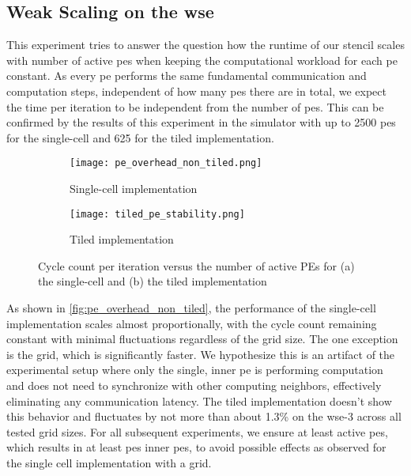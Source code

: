 \subsection{Weak Scaling on the \ac{wse}}
\label{sec:weak_scaling}
This experiment tries to answer the question how the runtime of our stencil scales with number of active \acp{pe} when keeping the computational workload for each \ac{pe} constant.
As every \ac{pe} performs the same fundamental communication and computation steps, independent of how many \acp{pe} there are in total, we expect the time per iteration to be independent from the number of \acp{pe}.
This can be confirmed by the results of this experiment in the simulator with up to \num{2500} \acp{pe} for the single-cell and \num{625} for the tiled implementation.

\begin{figure}[h]
    \centering
    \begin{subfigure}[b]{0.48\textwidth}
        \centering
        \texttt{[image: pe\_overhead\_non\_tiled.png]}
        \caption{Single-cell implementation}
        \label{fig:pe_overhead_non_tiled}
    \end{subfigure}
    \hfill
    \begin{subfigure}[b]{0.48\textwidth}
        \centering
        \texttt{[image: tiled\_pe\_stability.png]}
        \caption{Tiled implementation}
        \label{fig:tiled_pe_stability}
    \end{subfigure}
    \caption{Cycle count per iteration versus the number of active PEs for (a) the single-cell and (b) the tiled implementation}
    \label{fig:pe_overhead}
\end{figure}

As shown in \autoref{fig:pe_overhead_non_tiled}, the performance of the single-cell implementation scales almost proportionally, with the cycle count remaining constant with minimal fluctuations regardless of the grid size. The one exception is the  grid, which is significantly faster. We hypothesize this is an artifact of the experimental setup where only the single, inner \ac{pe} is performing computation and does not need to synchronize with other computing neighbors, effectively eliminating any communication latency.
The tiled implementation doesn't show this behavior and fluctuates by not more than about 1.3\% on the \ac{wse}-3 across all tested grid sizes.
For all subsequent experiments, we ensure at least  active \acp{pe}, which results in at least  \acp{pe} inner \acp{pe}, to avoid possible effects as observed for the single cell implementation with a  grid. 

